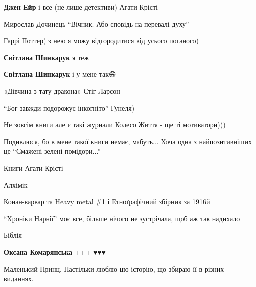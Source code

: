 \textbf{Джен Ейр} і все (не лише детективи) Агати Крісті


Мирослав Дочинець \enquote{Вічник. Або сповідь на перевалі духу}


Гаррі Поттер) з нею я можу відгородитися від усього поганого)

\begin{itemize} %
\textbf{Світлана Шинкарук} я теж🙆

\textbf{Світлана Шинкарук} і у мене так😄
\end{itemize} %


«Дівчина з тату дракона» Стіг Ларсон


\enquote{Бог завжди подорожує інкогніто} Гунеля)


Не зовсім книги але є такі журнали Колесо Життя - ще ті мотиватори)))


Подивлюся, бо в мене такої книги немає, мабуть... Хоча одна з найпозитивніших
це \enquote{Смажені зелені помідори...}


Книги Агати Крісті


Алхімік


Конан-варвар та Heavy metal \#1 і Етноґрафічний збірник за 1916й


\enquote{Хроніки Нарнії} моє все, більше нічого не зустрічала, щоб аж так надихало


Біблія

\begin{itemize} %
\textbf{Оксана Комарянська} +++ ♥️♥️♥️
\end{itemize} %


Маленький Принц. Настільки люблю цю історію, що збираю її в різних виданнях.


